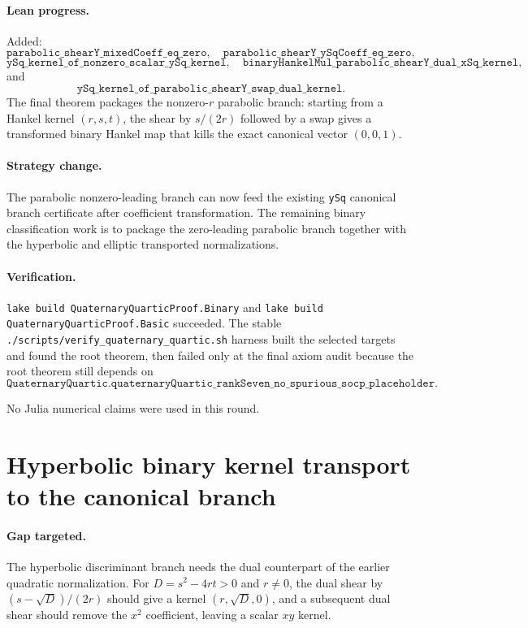 \documentclass[11pt]{article}
\begin{document}
\paragraph{Lean progress.}
Added:
\[
\texttt{parabolic\_shearY\_mixedCoeff\_eq\_zero},
\quad
\texttt{parabolic\_shearY\_ySqCoeff\_eq\_zero},
\]
\[
\texttt{ySq\_kernel\_of\_nonzero\_scalar\_ySq\_kernel},
\quad
\texttt{binaryHankelMul\_parabolic\_shearY\_dual\_xSq\_kernel},
\]
and
\[
\texttt{ySq\_kernel\_of\_parabolic\_shearY\_swap\_dual\_kernel}.
\]
The final theorem packages the nonzero-\(r\) parabolic branch: starting from a
Hankel kernel \((r,s,t)\), the shear by \(s/(2r)\) followed by a swap gives a
transformed binary Hankel map that kills the exact canonical vector
\((0,0,1)\).

\paragraph{Strategy change.}
The parabolic nonzero-leading branch can now feed the existing
\texttt{ySq} canonical branch certificate after coefficient transformation.
The remaining binary classification work is to package the zero-leading
parabolic branch together with the hyperbolic and elliptic transported
normalizations.

\paragraph{Verification.}
\texttt{lake build QuaternaryQuarticProof.Binary} and
\texttt{lake build QuaternaryQuarticProof.Basic} succeeded.  The stable
\texttt{./scripts/verify\_quaternary\_quartic.sh} harness built the selected
targets and found the root theorem, then failed only at the final axiom audit
because the root theorem still depends on
\[
\texttt{QuaternaryQuartic.quaternaryQuartic\_rankSeven\_no\_spurious\_socp\_placeholder}.
\]

No Julia numerical claims were used in this round.

\section*{Hyperbolic binary kernel transport to the canonical branch}

\paragraph{Gap targeted.}
The hyperbolic discriminant branch needs the dual counterpart of the earlier
quadratic normalization.  For \(D=s^2-4rt>0\) and \(r\ne0\), the dual shear by
\((s-\sqrt D)/(2r)\) should give a kernel \((r,\sqrt D,0)\), and a subsequent
dual shear should remove the \(x^2\) coefficient, leaving a scalar \(xy\)
kernel.
\end{document}
